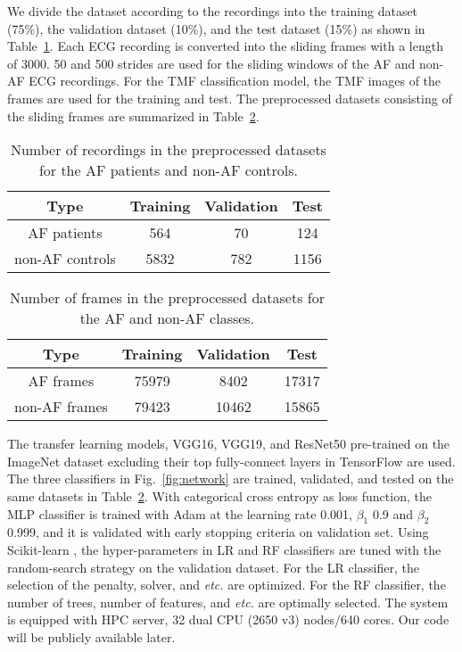 \documentclass[journal]{IEEEtran}
\begin{document}
We divide the dataset according to the recordings into the training dataset (75\%), the validation dataset (10\%), and the test dataset (15\%) as shown in Table~\ref{tab:dataset-patient-AF}. Each ECG recording is converted into the sliding frames with a length of 3000. 50 and 500 strides are used for the sliding windows of the AF and non-AF ECG recordings. For the TMF classification model, the TMF images of the frames are used for the training and test. The preprocessed datasets consisting of the sliding frames are summarized in Table~\ref{tab:dataset-AF}.

\begin{table}[H]
  \centering
  \caption{Number of recordings in the preprocessed datasets for the AF patients and non-AF controls.}
  \begin{tabular}{cccc}
  \hline
  Type  &  Training & Validation & Test\\
  \hline
  AF patients      &   564    &  70   & 124  \\
  non-AF controls  &   5832    &  782   & 1156  \\
  \hline
  \end{tabular}
  \label{tab:dataset-patient-AF}
\end{table}

\begin{table}[H]
  \centering
  \caption{Number of frames in the preprocessed datasets for the AF and non-AF classes.}
  \begin{tabular}{cccc}
  \hline
  Type  &  Training & Validation & Test\\
  \hline
  AF frames      &   75979    &  8402   & 17317  \\
  non-AF frames  &   79423    &  10462   & 15865  \\
  \hline
  \end{tabular}
  \label{tab:dataset-AF}
\end{table}

The transfer learning models, VGG16, VGG19, and ResNet50 pre-trained on the ImageNet dataset excluding their top fully-connect layers in TensorFlow\cite{tensorflow} are used. The three classifiers in Fig.~\ref{fig:network} are trained, validated, and tested on the same datasets in Table~\ref{tab:dataset-AF}. 
With categorical cross entropy as loss function, the MLP classifier is trained with Adam \cite{Adam_2015} at the learning rate 0.001, $\beta_1$ 0.9 and $\beta_2$ 0.999, and it is validated with early stopping criteria on validation set.
Using Scikit-learn \cite{scikit-learn}, the hyper-parameters in LR and RF classifiers are tuned with the random-search strategy on the validation dataset. For the LR classifier, the selection of the penalty, solver, and {\it etc.} are optimized. For the RF classifier, the number of trees, number of features, and {\it etc.} are optimally selected. 
The system is equipped with HPC server, 32 dual CPU (2650 v3) nodes/640 cores. Our code will be publicly available later.
\end{document}
